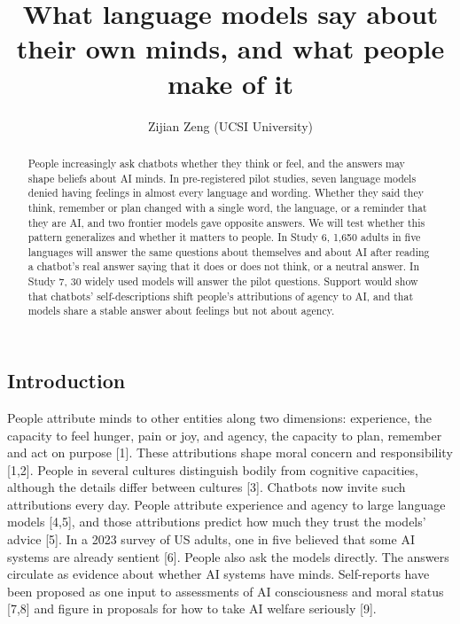 \documentclass[
  11pt,
]{article}
\title{What language models say about their own minds, and what people
make of it}
\author{Zijian Zeng (UCSI University)}
\date{}
\begin{document}
\maketitle
\begin{abstract}
People increasingly ask chatbots whether they think or feel, and the
answers may shape beliefs about AI minds. In pre-registered pilot
studies, seven language models denied having feelings in almost every
language and wording. Whether they said they think, remember or plan
changed with a single word, the language, or a reminder that they are
AI, and two frontier models gave opposite answers. We will test whether
this pattern generalizes and whether it matters to people. In Study 6,
1,650 adults in five languages will answer the same questions about
themselves and about AI after reading a chatbot's real answer saying
that it does or does not think, or a neutral answer. In Study 7, 30
widely used models will answer the pilot questions. Support would show
that chatbots' self-descriptions shift people's attributions of agency
to AI, and that models share a stable answer about feelings but not
about agency.
\end{abstract}

\hypertarget{introduction}{%
\subsection{Introduction}\label{introduction}}

People attribute minds to other entities along two dimensions:
experience, the capacity to feel hunger, pain or joy, and agency, the
capacity to plan, remember and act on purpose {[}1{]}. These
attributions shape moral concern and responsibility {[}1,2{]}. People in
several cultures distinguish bodily from cognitive capacities, although
the details differ between cultures {[}3{]}. Chatbots now invite such
attributions every day. People attribute experience and agency to large
language models {[}4,5{]}, and those attributions predict how much they
trust the models' advice {[}5{]}. In a 2023 survey of US adults, one in
five believed that some AI systems are already sentient {[}6{]}. People
also ask the models directly. The answers circulate as evidence about
whether AI systems have minds. Self-reports have been proposed as one
input to assessments of AI consciousness and moral status {[}7,8{]} and
figure in proposals for how to take AI welfare seriously {[}9{]}.
\end{document}
